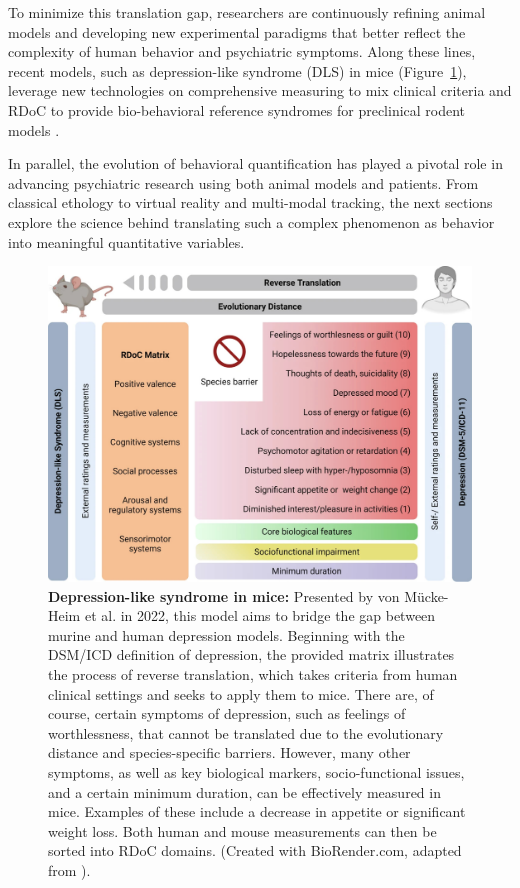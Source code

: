 To minimize this translation gap, researchers are continuously refining animal models and developing new experimental paradigms that better reflect the complexity of human behavior and psychiatric symptoms. Along these lines, recent models, such as depression-like syndrome (DLS) in mice (Figure~\ref{fig:1.1}), leverage new technologies on comprehensive measuring to mix clinical criteria and RDoC to provide bio-behavioral reference syndromes for preclinical rodent models \cite{vonMucke-Heim2022IntroducingMice}.

In parallel, the evolution of behavioral quantification has played a pivotal role in advancing psychiatric research using both animal models and patients. From classical ethology to virtual reality and multi-modal tracking, the next sections explore the science behind translating such a complex phenomenon as behavior into meaningful quantitative variables.

\begin{figure}[!thb]
\centering
\includegraphics[width=\textwidth]{Figures/intro_1.pdf}

\caption[\textbf{Depression-like syndrome in mice}]{\textbf{Depression-like syndrome in mice:} Presented by von Mücke-Heim et al. in 2022, this model aims to bridge the gap between murine and human depression models. Beginning with the DSM/ICD definition of depression, the provided matrix illustrates the process of reverse translation, which takes criteria from human clinical settings and seeks to apply them to mice. There are, of course, certain symptoms of depression, such as feelings of worthlessness, that cannot be translated due to the evolutionary distance and species-specific barriers. However, many other symptoms, as well as key biological markers, socio-functional issues, and a certain minimum duration, can be effectively measured in mice. Examples of these include a decrease in appetite or significant weight loss. Both human and mouse measurements can then be sorted into RDoC domains. (Created with BioRender.com, adapted from \cite{vonMucke-Heim2022IntroducingMice}).}
\label{fig:1.1}

\end{figure}

